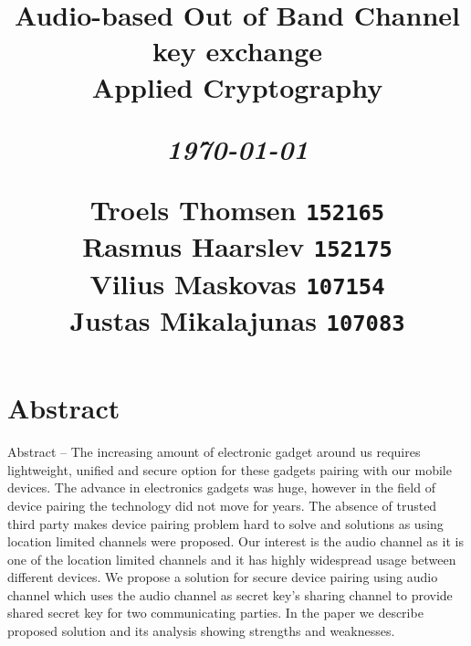 \documentclass[12pt]{article}
\title{
  \vspace{4cm}
  \begin{flushleft}
  \Large{\textbf{Audio-based Out of Band Channel key exchange}} \\
  \large{Applied Cryptography}
  \end{flushleft}
  \vspace{0cm}
  \begin{flushleft}
  \small
  \textit{\today}
  \end{flushleft}
  \vspace{12cm}
  \begin{flushleft}
  \small
  Troels Thomsen \texttt{152165} \\
  Rasmus Haarslev \texttt{152175} \\
  Vilius Maskovas \texttt{107154} \\
  Justas Mikalajunas \texttt{107083}\\
  \end{flushleft}
}
\date{
}
\begin{document}
\clearpage
{}
\thispagestyle{empty}
\maketitle

\newpage

\tableofcontents

\newpage


\section{Abstract}
\label{sec:Abstract}
Abstract – The increasing amount of electronic gadget around us requires lightweight, unified and secure option for these gadgets pairing with our mobile devices. The advance in electronics gadgets was huge, however in the field of device pairing the technology did not move for years. The absence of trusted third party makes device pairing problem hard to solve and solutions as using location limited channels were proposed. Our interest is the audio channel as it is one of the location limited channels and it has highly widespread usage between different devices.
We propose a solution for secure device pairing using audio channel which uses the audio channel as secret key’s sharing channel to provide shared secret key for two communicating parties. In the paper we describe proposed solution and its analysis showing strengths and weaknesses.

\newpage
\end{document}
